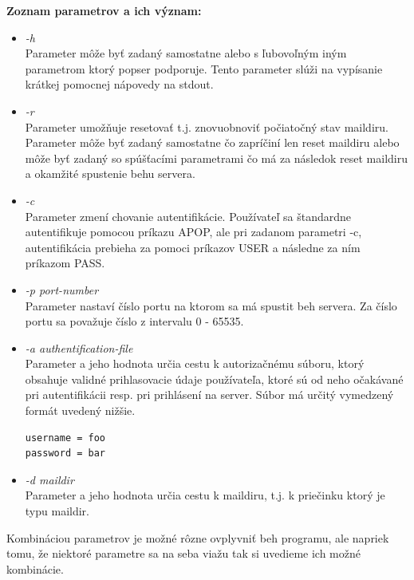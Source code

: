 \documentclass[11pt,a4paper]{article}
\begin{document}
	\textbf{Zoznam parametrov a ich význam:}
	\begin{itemize}

		\item \textit{-h}\\[0.4em]
			Parameter môže byť zadaný samostatne alebo s ľubovoľným iným parametrom ktorý popser podporuje. Tento parameter slúži na vypísanie krátkej pomocnej nápovedy na stdout.

		\item \textit{-r}\\[0.4em]
			Parameter umožňuje resetovať t.j. znovuobnoviť počiatočný stav maildiru. Parameter môže byť zadaný samostatne čo zapríčiní len reset maildiru alebo môže byť zadaný so spúšťacími parametrami čo má za následok reset maildiru a okamžité spustenie behu servera.

		\item \textit{-c}\\[0.4em]
			Parameter zmení chovanie autentifikácie. Používateľ sa štandardne autentifikuje pomocou príkazu APOP, ale pri zadanom parametri -c, autentifikácia prebieha za pomoci príkazov USER a následne za ním príkazom PASS.

		\item \textit{-p port-number}\\[0.4em]
			Parameter nastaví číslo portu na ktorom sa má spustit beh servera. Za číslo portu sa považuje číslo z intervalu 0 - 65535.

		\item \textit{-a authentification-file}\\[0.4em]
			Parameter a jeho hodnota určia cestu k autorizačnému súboru, ktorý obsahuje validné prihlasovacie údaje používateľa, ktoré sú od neho očakávané pri autentifikácii resp. pri prihlásení na server. Súbor má určitý vymedzený formát uvedený nižšie.
\begin{lstlisting}[xleftmargin=.35\textwidth]
username = foo
password = bar
\end{lstlisting}

		\item \textit{-d maildir}\\[0.4em]
			Parameter a jeho hodnota určia cestu k maildiru, t.j. k priečinku ktorý je typu maildir\cite{MAILDIR}.\\

	\end{itemize}

	Kombináciou parametrov je možné rôzne ovplyvniť beh programu, ale napriek tomu, že niektoré parametre sa na seba viažu tak si uvedieme ich možné kombinácie.\\
\end{document}
